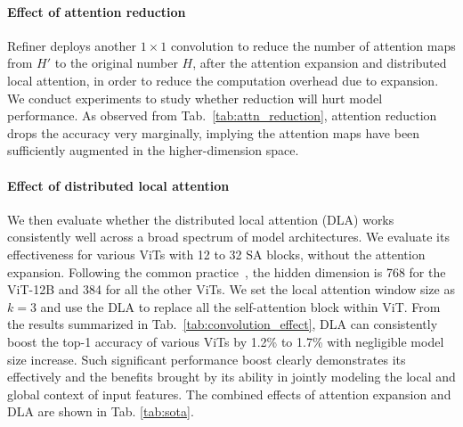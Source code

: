 \vspace{-2mm}
\paragraph{Effect of attention   reduction} Refiner  deploys another $1\times 1$ convolution to reduce the number of attention maps from $H'$ to the original number $H$,  after the attention expansion and distributed local attention, in order to reduce the computation overhead due to expansion. We conduct experiments to study whether reduction will hurt model performance.  As observed from Tab.~\ref{tab:attn_reduction}, attention reduction   drops the accuracy very marginally, implying the attention maps have been sufficiently augmented in the higher-dimension space. 

\vspace{-2mm}
\paragraph{Effect of distributed local attention} We then evaluate whether the distributed local attention (DLA)    works consistently well across a broad spectrum of model architectures. We evaluate its effectiveness for various ViTs with 12 to 32 SA blocks, without the attention expansion. Following the common practice~\cite{dosovitskiy2020image}, the hidden dimension is 768 for the ViT-12B and 384 for all the other ViTs.   We set the local attention window size as $k=3$ and use the DLA to replace all the self-attention block within ViT. From the results   summarized in Tab.~\ref{tab:convolution_effect}, DLA  can consistently boost the top-1 accuracy of various ViTs by 1.2\% to 1.7\% with negligible model size increase. Such significant performance boost clearly demonstrates  its effectively and the benefits brought by its ability in  jointly modeling the local and global context of input features. The combined effects of attention expansion and DLA are shown in Tab. \ref{tab:sota}.


